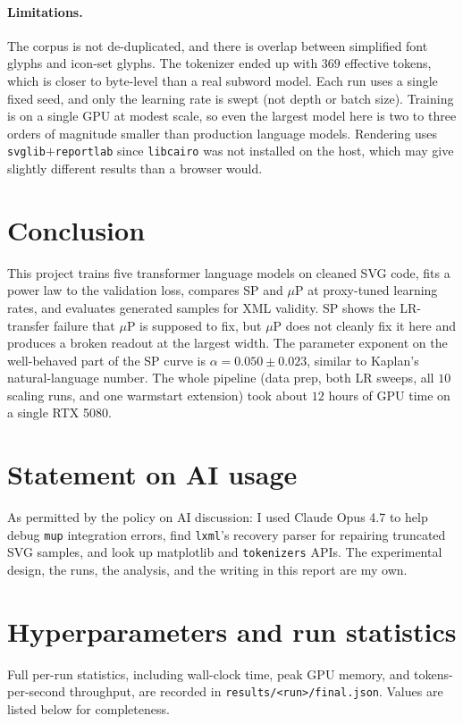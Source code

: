 \documentclass[11pt]{article}
\begin{document}
\paragraph{Limitations.}
The corpus is not de-duplicated, and there is overlap between simplified font glyphs and icon-set glyphs. The tokenizer ended up with $369$ effective tokens, which is closer to byte-level than a real subword model. Each run uses a single fixed seed, and only the learning rate is swept (not depth or batch size). Training is on a single GPU at modest scale, so even the largest model here is two to three orders of magnitude smaller than production language models. Rendering uses \texttt{svglib}$+$\texttt{reportlab} since \texttt{libcairo} was not installed on the host, which may give slightly different results than a browser would.

\section{Conclusion}
This project trains five transformer language models on cleaned SVG code, fits a power law to the validation loss, compares SP and $\mu$P at proxy-tuned learning rates, and evaluates generated samples for XML validity. SP shows the LR-transfer failure that $\mu$P is supposed to fix, but $\mu$P does not cleanly fix it here and produces a broken readout at the largest width. The parameter exponent on the well-behaved part of the SP curve is $\alpha = 0.050 \pm 0.023$, similar to Kaplan's natural-language number. The whole pipeline (data prep, both LR sweeps, all $10$ scaling runs, and one warmstart extension) took about $12$ hours of GPU time on a single RTX 5080.

\section*{Statement on AI usage}
As permitted by the policy on AI discussion: I used Claude Opus 4.7 to help debug \texttt{mup} integration errors, find \texttt{lxml}'s recovery parser for repairing truncated SVG samples, and look up matplotlib and \texttt{tokenizers} APIs. The experimental design, the runs, the analysis, and the writing in this report are my own.




\appendix
\section{Hyperparameters and run statistics}
Full per-run statistics, including wall-clock time, peak GPU memory, and tokens-per-second throughput, are recorded in \texttt{results/<run>/final.json}. Values are listed below for completeness.
\end{document}

